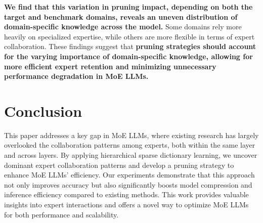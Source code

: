 \documentclass[11pt]{article}
\begin{document}
\textbf{We find that this variation in pruning impact, depending on both the target and benchmark domains, reveals an uneven distribution of domain-specific knowledge across the model.} Some domains rely more heavily on specialized expertise, while others are more flexible in terms of expert collaboration. These findings suggest that \textbf{pruning strategies should account for the varying importance of domain-specific knowledge, allowing for more efficient expert retention and minimizing unnecessary performance degradation in MoE LLMs.}







\section{Conclusion}

This paper addresses a key gap in MoE LLMs, where existing research has largely overlooked the collaboration patterns among experts, both within the same layer and across layers. By applying hierarchical sparse dictionary learning, we uncover dominant expert collaboration patterns and develop a pruning strategy to enhance MoE LLMs' efficiency. Our experiments demonstrate that this approach not only improves accuracy but also significantly boosts model compression and inference efficiency compared to existing methods. This work provides valuable insights into expert interactions and offers a novel way to optimize MoE LLMs for both performance and scalability.
\end{document}
